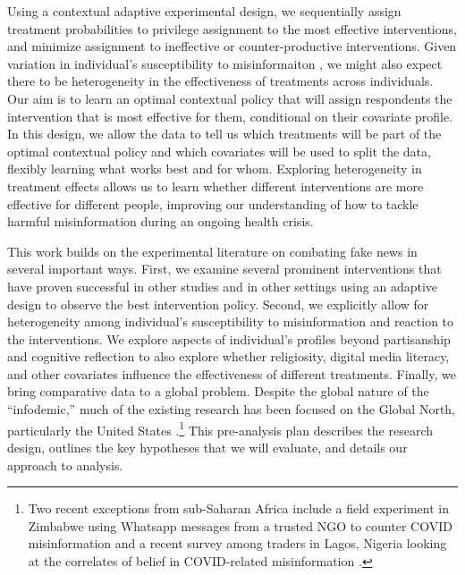 \documentclass[letterpaper, 12pt, parskip=full,]{scrartcl}
\begin{document}

Using a contextual adaptive experimental design, we sequentially assign treatment probabilities to privilege assignment to the most effective interventions, and minimize assignment to ineffective or counter-productive interventions. Given variation in individual's susceptibility to misinformaiton \citep{wittenberg2020misinformation}, we might also expect there to be heterogeneity in the effectiveness of treatments across individuals. Our aim is to learn an optimal contextual policy that will assign respondents the intervention that is most effective for them, conditional on their covariate profile. In this design, we allow the data to tell us which treatments will be part of the optimal contextual policy and which covariates will be used to split the data, flexibly learning what works best and for whom. Exploring heterogeneity in treatment effects allows us to learn whether different interventions are more effective for different people, improving our understanding of how to tackle harmful misinformation during an ongoing health crisis. 




This work builds on the experimental literature on combating fake news in several important ways. First, we examine several prominent interventions that have proven successful in other studies and in other settings using an adaptive design to observe the best intervention policy. Second, we explicitly allow for heterogeneity among individual's susceptibility to misinformation and reaction to the interventions. We explore aspects of individual's profiles beyond partisanship and cognitive reflection to also explore whether religiosity, digital media literacy, and other covariates influence the effectiveness of different treatments. Finally, we bring comparative data to a global problem. Despite the global nature of the ``infodemic,'' much of the existing research has been focused on the Global North, particularly the United States \citep{pennycook2020fighting, bursztyn2020misinformation}.\footnote{Two recent exceptions from sub-Saharan Africa include a field experiment in Zimbabwe using Whatsapp messages from a trusted NGO  to counter COVID misinformation \citep{bowles2020center} and a recent survey among traders in Lagos, Nigeria looking at the correlates of belief in COVID-related misinformation \citep{Grossman2020}.} This pre-analysis plan describes the research design, outlines the key hypotheses that we will evaluate, and details our approach to analysis.
\end{document}
